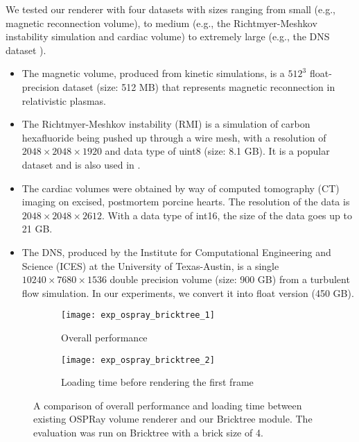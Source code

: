 We tested our renderer with four datasets with sizes ranging from small (e.g., magnetic 
reconnection volume\cite{guo2014formation}), to medium (e.g., the Richtmyer-Meshkov instability simulation
\cite{cohen2002three} and cardiac volume\cite{scivisdata}) to extremely large (e.g., the DNS dataset \cite{moser1999direct}).
\begin{itemize}
\item The magnetic volume, produced from kinetic simulations, is a $512^3$ float-precision dataset
(size: 512 MB) that represents magnetic reconnection in relativistic plasmas. 
\item The Richtmyer-Meshkov instability (RMI) is a simulation of carbon hexafluoride being pushed up through a wire mesh, with a resolution of $2048 \times 2048 \times 1920$ and data type of uint8 (size: 8.1 GB). It is a popular dataset and is also used in \cite{fogal2013analysis, wu2018visit, knoll2006interactive}. 
\item The cardiac volumes were obtained by way of computed tomography (CT) imaging on excised,
postmortem porcine hearts. The resolution of the data is $2048 \times 2048 \times 2612$. With a data
type of int16, the size of the data goes up to 21 GB. 
\item The DNS, produced by the Institute for Computational Engineering and Science (ICES) at the
	University of Texas-Austin, is a single $10240 \times 7680 \times 1536$ double precision volume (size: 900 GB) from a turbulent flow simulation. In our experiments, we convert it into float version (450 GB).  
\end{itemize}

\begin{figure}[h]
    \centering
    \begin{subfigure}[b]{0.9\columnwidth}
        \texttt{[image: exp\_ospray\_bricktree\_1]}
        \vspace{-1em}
        \caption{Overall performance}
        \label{fig:exp_ospray_bricktree_framerate}
    \end{subfigure}
    \begin{subfigure}[b]{0.9\columnwidth}
        \texttt{[image: exp\_ospray\_bricktree\_2]}
        \vspace{-1em}
        \caption{Loading time before rendering the first frame}
        \label{fig:exp_ospray_bricktree_waitingtime}
    \end{subfigure}
	\caption{\label{fig:exp_ospray_bricktree}%
	A comparison of overall performance and loading time between existing OSPRay volume renderer and our Bricktree module. The evaluation was run on Bricktree with a brick size of 4.}
	\vspace{-0.5em}
\end{figure}

